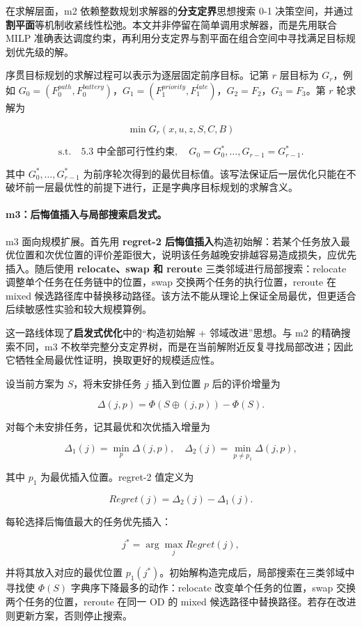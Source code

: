 在求解层面，m2 依赖整数规划求解器的\textbf{分支定界}思想搜索 0-1 决策空间，并通过\textbf{割平面}等机制收紧线性松弛。本文并非停留在简单调用求解器，而是先用联合 MILP 准确表达调度约束，再利用分支定界与割平面在组合空间中寻找满足目标规划优先级的解。

序贯目标规划的求解过程可以表示为逐层固定前序目标。记第 $r$ 层目标为 $G_r$，例如 $G_0=(F_0^{path},F_0^{battery})$，$G_1=(F_1^{priority},F_1^{late})$，$G_2=F_2$，$G_3=F_3$。第 $r$ 轮求解为

\[
\min G_r(x,u,z,S,C,B)
\]

\[
\text{s.t.}\quad \text{5.3 中全部可行性约束},\quad
G_0=G_0^*,\ldots,G_{r-1}=G_{r-1}^*.
\]

其中 $G_0^*,\ldots,G_{r-1}^*$ 为前序轮次得到的最优目标值。该写法保证后一层优化只能在不破坏前一层最优性的前提下进行，正是字典序目标规划的求解含义。

\paragraph{m3：后悔值插入与局部搜索启发式。}
m3 面向规模扩展。首先用 \textbf{regret-2 后悔值插入}构造初始解：若某个任务放入最优位置和次优位置的评价差距很大，说明该任务越晚安排越容易造成损失，应优先插入。随后使用 \textbf{relocate、swap 和 reroute} 三类邻域进行局部搜索：relocate 调整单个任务在任务链中的位置，swap 交换两个任务的执行位置，reroute 在 mixed 候选路径库中替换移动路径。该方法不能从理论上保证全局最优，但更适合后续敏感性实验和较大规模算例。

这一路线体现了\textbf{启发式优化}中的“构造初始解 + 邻域改进”思想。与 m2 的精确搜索不同，m3 不枚举完整分支定界树，而是在当前解附近反复寻找局部改进；因此它牺牲全局最优性证明，换取更好的规模适应性。

设当前方案为 $S$，将未安排任务 $j$ 插入到位置 $p$ 后的评价增量为

\[
\Delta(j,p)=\Phi(S\oplus(j,p))-\Phi(S).
\]

对每个未安排任务，记其最优和次优插入增量为

\[
\Delta_1(j)=\min_p \Delta(j,p),\quad
\Delta_2(j)=\min_{p\ne p_1}\Delta(j,p),
\]

其中 $p_1$ 为最优插入位置。regret-2 值定义为

\[
Regret(j)=\Delta_2(j)-\Delta_1(j).
\]

每轮选择后悔值最大的任务优先插入：

\[
j^*=\arg\max_{j}Regret(j),
\]

并将其放入对应的最优位置 $p_1(j^*)$。初始解构造完成后，局部搜索在三类邻域中寻找使 $\Phi(S)$ 字典序下降最多的动作：relocate 改变单个任务的位置，swap 交换两个任务的位置，reroute 在同一 OD 的 mixed 候选路径中替换路径。若存在改进则更新方案，否则停止搜索。

